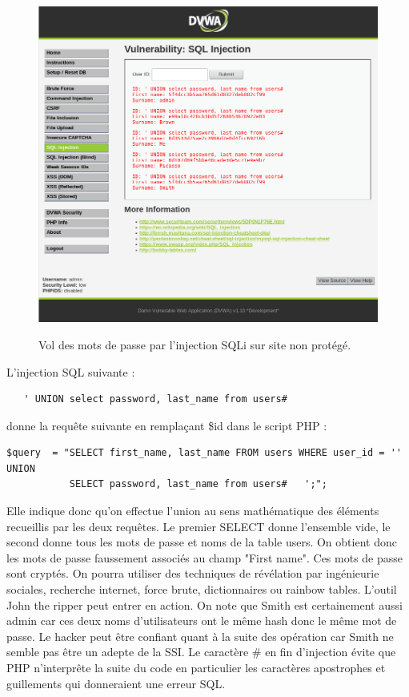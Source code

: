 \begin{figure}[!h]
	\begin{center}
		\label{}
		\includegraphics[scale=\scaledvwa]{images/sql/sqli_low.png}
		\caption{Vol des mots de passe par l'injection SQLi sur site non protégé.}
	\end{center}
\end{figure}

L'injection SQL suivante :
{\color{red}

\begin{verbatim}
   ' UNION select password, last_name from users#
\end{verbatim}
}


donne la requête suivante en remplaçant \$id dans le script PHP :

{\color{red}
\begin{verbatim}
$query  = "SELECT first_name, last_name FROM users WHERE user_id = '' UNION 
           SELECT password, last_name from users#   ';"; 
\end{verbatim}
}
Elle indique donc qu'on effectue l'union au sens mathématique des éléments recueillis par les deux requêtes. Le premier SELECT donne l'ensemble vide, le second donne tous les mots de passe et noms de la table users. On obtient donc les mots de passe faussement associés au champ "First name". Ces mots de passe sont cryptés. On pourra utiliser des techniques de révélation par ingénieurie sociales, recherche internet, force brute, dictionnaires ou rainbow tables. L'outil John the ripper peut entrer en action. On note que Smith est certainement aussi admin car ces deux noms d'utilisateurs ont le même hash donc le même mot de passe. Le hacker peut être confiant quant à la suite des opération car Smith ne semble pas être un adepte de la SSI. Le caractère \# en fin d'injection évite que PHP n'interprête la suite du code en particulier les caractères apostrophes et guillements qui donneraient une erreur SQL.

